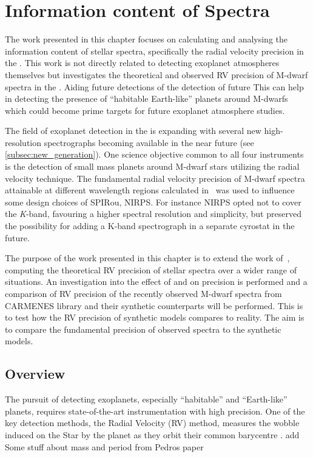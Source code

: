 
\chapter{Information content of \nir{} Spectra}
\label{cha:nir_content}

The work presented in this chapter focuses on calculating and analysing the information content of stellar spectra, specifically the radial velocity precision in the \nir{}.
This work is not directly related to detecting exoplanet atmospheres themselves but investigates the theoretical and observed {RV} precision of {M-dwarf} spectra in the \nir{}.
Aiding future detections of the detection of future
This can help in detecting the presence of ``habitable Earth-like'' planets around {M-dwarfs} which could become prime targets for future exoplanet atmosphere studies.

The field of exoplanet detection in the \nir{} is expanding with several new high-resolution \nir{} spectrographs becoming available in the near future (see \cref{subsec:new_generation}).
One science objective common to all four instruments is the detection of small mass planets around {M-dwarf} stars utilizing the radial velocity technique.
The fundamental radial velocity precision of {M-dwarf} spectra attainable at different wavelength regions calculated in~\citet{figueira_radial_2016} was used to influence some design choices of {SPIRou}, {NIRPS}.
For instance {NIRPS} opted not to cover the \emph{K}-band, favouring a higher spectral resolution and simplicity, but preserved the possibility for adding a K-band spectrograph in a separate cyrostat in the future.

The purpose of the work presented in this chapter is to extend the work of~\citet{figueira_radial_2016}, computing the theoretical RV precision of stellar spectra over a wider range of situations.
An investigation into the effect of \logg{} and \feh{} on precision is performed and a comparison of RV precision of the recently observed \nir{} {M-dwarf} spectra from {CARMENES} library and their synthetic counterparts will be performed.
This is to test how the {RV} precision of synthetic models compares to reality.
The aim is to compare the fundamental precision of observed \nir{} spectra to the synthetic models.


\section{Overview}
The pursuit of detecting exoplanets, especially ``habitable'' and ``Earth-like'' planets, requires state-of-the-art instrumentation with high precision.
One of the key detection methods, the Radial Velocity ({RV}) method, measures the wobble induced on the Star by the planet as they orbit their common barycentre .  {\red{} add Some stuff about mass and period from Pedros paper}  

